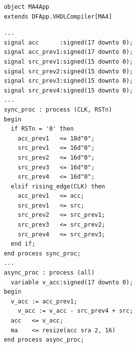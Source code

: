 \begin{figure}[t!]
\begin{minipage}[b][10.8cm][t]{0.32\linewidth}
\begin{verbatim}
			object MA4App 
			extends DFApp.VHDLCompiler[MA4]
    \end{verbatim}
    \label{fig:MADFiant}
  \end{minipage}%
  \hfill
  \begin{minipage}[b][10.8cm][t]{0.325\linewidth}
    \centering
    \captionsetup{justification=centering}
		\begin{verbatim}
			...
			signal acc      :signed(17 downto 0);
			signal acc_prev1:signed(17 downto 0);
			signal src_prev1:signed(15 downto 0);
			signal src_prev2:signed(15 downto 0);
			signal src_prev3:signed(15 downto 0);
			signal src_prev4:signed(15 downto 0);
			...
			sync_proc : process (CLK, RSTn)
			begin
			  if RSTn = '0' then
			    acc_prev1   <= 18d"0";
			    src_prev1   <= 16d"0";
			    src_prev2   <= 16d"0";
			    src_prev3   <= 16d"0";
			    src_prev4   <= 16d"0";
			  elsif rising_edge(CLK) then
			    acc_prev1   <= acc;
			    src_prev1   <= src;
			    src_prev2   <= src_prev1;
			    src_prev3   <= src_prev2;
			    src_prev4   <= src_prev3;
			  end if;
			end process sync_proc;
			...
			async_proc : process (all)
			  variable v_acc:signed(17 downto 0);
			begin
			  v_acc := acc_prev1;
				v_acc := v_acc - src_prev4 + src;
			  acc   <= v_acc;
			  ma    <= resize(acc sra 2, 16)
			end process async_proc;
    \end{verbatim}
    \label{fig:MAVHDL}
  \end{minipage}%
	\hfill
  \begin{minipage}[b][10.8cm][t]{0.34\linewidth}
		\centering


\end{minipage}
\end{figure}

